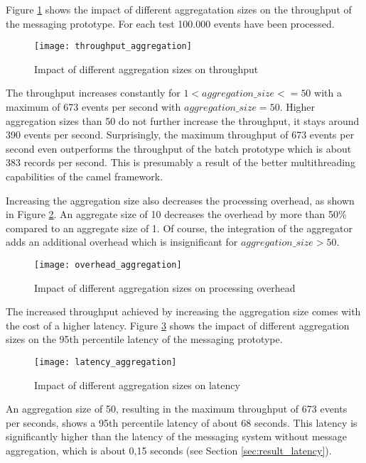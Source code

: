 Figure \ref{fig:ch4_throughput_aggregation} shows the impact of different aggregatation sizes on the throughput of the messaging prototype. For each test 100.000 events have been processed.
\begin{figure}[htbp]
	\centering
	\texttt{[image: throughput\_aggregation]}
	\caption{Impact of different aggregation sizes on throughput}
	\label{fig:ch4_throughput_aggregation}
\end{figure}
The throughput increases constantly for $1<aggregation\_size<=50$ with a maximum of 673 events per second with $aggregation\_size=50$. Higher aggregation sizes than 50 do not further increase the throughput, it stays around 390 events per second. Surprisingly, the maximum throughput of 673 events per second even outperforms the throughput of the batch prototype which is about 383 records per second. This is presumably a result of the better multithreading capabilities of the camel framework.

Increasing the aggregation size also decreases the processing overhead, as shown in Figure \ref{fig:ch4_overhead_aggregation}. An aggregate size of 10 decreases the overhead by more than 50\% compared to an aggregate size of 1. Of course, the integration of the aggregator adds an additional overhead which is insignificant for $aggregation\_size>50$.
\begin{figure}[htbp]
	\centering
	\texttt{[image: overhead\_aggregation]}
	\caption{Impact of different aggregation sizes on processing overhead}
	\label{fig:ch4_overhead_aggregation}
\end{figure}

The increased throughput achieved by increasing the aggregation size comes with the cost of a higher latency. Figure \ref{fig:ch4_latency_aggregation} shows the impact of different aggregation sizes on the 95th percentile latency of the messaging prototype. 
\begin{figure}[htbp]
	\centering
	\texttt{[image: latency\_aggregation]}
	\caption{Impact of different aggregation sizes on latency}
	\label{fig:ch4_latency_aggregation}
\end{figure}

An aggregation size of 50, resulting in the maximum throughput of 673 events per seconds, shows a 95th percentile latency of about 68 seconds. This latency is significantly higher than the latency of the messaging system without message aggregation, which is about 0,15 seconds (see Section \ref{sec:result_latency}).

